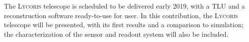 \documentclass[conference]{IEEEtran}
\def\lycoris{\textsc{Lycoris }}%
\begin{document}
The \lycoris telescope is scheduled to be delivered early 2019, with a TLU and a reconstruction software ready-to-use for user.
In this contribution, the \lycoris telescope will be presented, with its first results and a comparison to simulation;
the characterization of the sensor and readout system will also be included.

%
%



%
%
\end{document}
